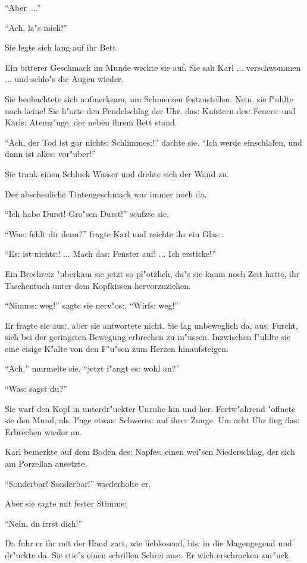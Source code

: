 \documentclass[oneside,12pt]{book}
\newcommand{\s}{s:}%
\begin{document}
"`Aber~..."'

"`Ach, la"s mich!"'

Sie legte sich lang auf ihr Bett.

Ein bitterer Geschmack im Munde weckte sie auf. Sie sah Karl ...
verschwommen ... und schlo"s die Augen wieder.

Sie beobachtete sich aufmerksam, um Schmerzen fest\/zustellen. Nein,
sie f"uhlte noch keine! Sie h"orte den Pendelschlag der Uhr,
da{\s} Knistern de{\s} Feuer{\s} und Karl{\s} Atemz"uge, der neben
ihrem Bett stand.

"`Ach, der Tod ist gar nicht{\s} Schlimme{\s}!"' dachte sie. "`Ich
werde einschlafen, und dann ist alle{\s} vor"uber!"'

Sie trank einen Schluck Wasser und drehte sich der Wand zu.

Der abscheuliche Tintengeschmack war immer noch da.

"`Ich habe Durst! Gro"sen Durst!"' seufzte sie.

"`Wa{\s} fehlt dir denn?"' fragte Karl und reichte ihr ein
Gla{\s}.

"`E{\s} ist nicht{\s}! ... Mach da{\s} Fenster auf! ... Ich
ersticke!"'

Ein Brechreiz "uberkam sie jetzt so pl"otzlich, da"s sie kaum noch
Zeit hatte, ihr Taschentuch unter dem Kopfkissen hervorzuziehen.

"`Nimm{\s} weg!"' sagte sie nerv"o{\s}. "`Wirf{\s} weg!"'

Er fragte sie au{\s}, aber sie antwortete nicht. Sie lag
unbeweglich da, au{\s} Furcht, sich bei der geringsten Bewegung
erbrechen zu m"ussen. Inzwischen f"uhlte sie eine eisige K"alte
von den F"u"sen zum Herzen hinaufsteigen.

"`Ach,"' murmelte sie, "`jetzt f"angt e{\s} wohl an?"'

"`Wa{\s} sagst du?"'

Sie warf den Kopf in unterdr"uckter Unruhe hin und her.
Fortw"ahrend "offnete sie den Mund, al{\s} l"age etwa{\s}
Schwere{\s} auf ihrer Zunge. Um acht Uhr fing da{\s} Erbrechen
wieder an.

Karl bemerkte auf dem Boden de{\s} Napfe{\s} einen wei"sen
Niederschlag, der sich am Porzellan ansetzte.

"`Sonderbar! Sonderbar!"' wiederholte er.

Aber sie sagte mit fester Stimme:

"`Nein, du irrst dich!"'

Da fuhr er ihr mit der Hand zart, wie liebkosend, bi{\s} in die
Magengegend und dr"uckte da. Sie stie"s einen schrillen Schrei
au{\s}. Er wich erschrocken zur"uck.
\end{document}

